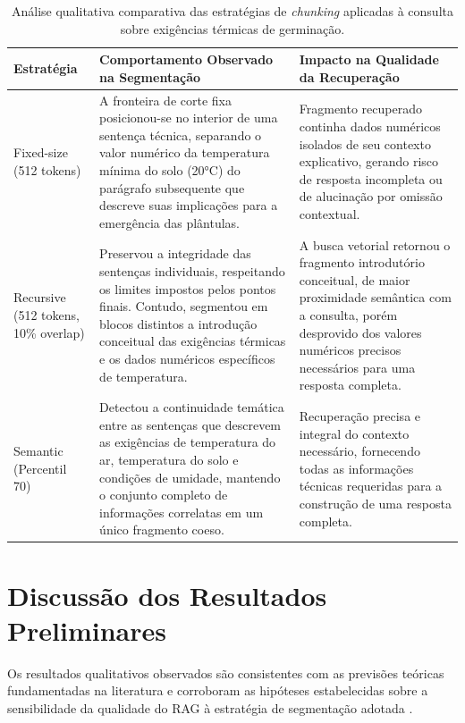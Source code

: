 \documentclass[
	12pt,				%
	openright,			%
	oneside,			%
	a4paper,			%
	tccpreliminar,		%
	]{ABNT-DC-UEL}
\begin{document}
\begin{table}[ht]
\centering
\caption{Análise qualitativa comparativa das estratégias de \textit{chunking} aplicadas à consulta sobre exigências térmicas de germinação.}
\label{tab:qualitativa}
\begin{tabular}{p{3cm}p{5.5cm}p{5.5cm}}
\toprule
\textbf{Estratégia} & \textbf{Comportamento Observado na Segmentação} & \textbf{Impacto na Qualidade da Recuperação} \\
\midrule
Fixed-size (512 tokens) & A fronteira de corte fixa posicionou-se no interior de uma sentença técnica, separando o valor numérico da temperatura mínima do solo (20°C) do parágrafo subsequente que descreve suas implicações para a emergência das plântulas. & Fragmento recuperado continha dados numéricos isolados de seu contexto explicativo, gerando risco de resposta incompleta ou de alucinação por omissão contextual. \\
\midrule
Recursive (512 tokens, 10\% overlap) & Preservou a integridade das sentenças individuais, respeitando os limites impostos pelos pontos finais. Contudo, segmentou em blocos distintos a introdução conceitual das exigências térmicas e os dados numéricos específicos de temperatura. & A busca vetorial retornou o fragmento introdutório conceitual, de maior proximidade semântica com a consulta, porém desprovido dos valores numéricos precisos necessários para uma resposta completa. \\
\midrule
Semantic (Percentil 70) & Detectou a continuidade temática entre as sentenças que descrevem as exigências de temperatura do ar, temperatura do solo e condições de umidade, mantendo o conjunto completo de informações correlatas em um único fragmento coeso. & Recuperação precisa e integral do contexto necessário, fornecendo todas as informações técnicas requeridas para a construção de uma resposta completa. \\
\bottomrule
\end{tabular}
\end{table}


\section{Discussão dos Resultados Preliminares}

Os resultados qualitativos observados são consistentes com as previsões teóricas fundamentadas na literatura e corroboram as hipóteses estabelecidas sobre a sensibilidade da qualidade do RAG à estratégia de segmentação adotada \cite{wang2024bestpractices, finardi2024chronicles}.
\end{document}
